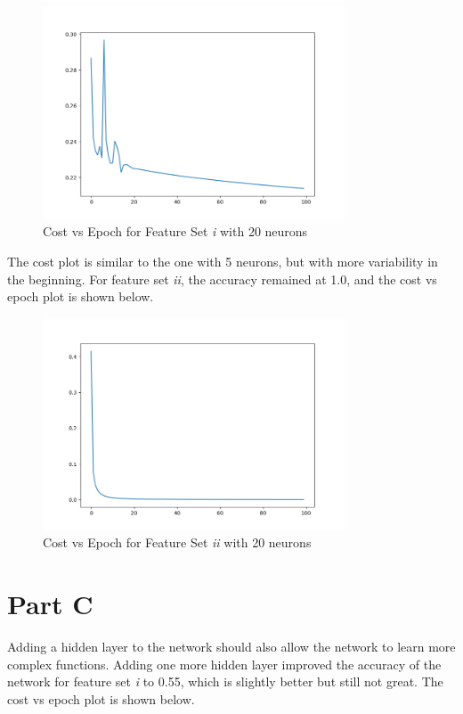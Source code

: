 \documentclass{article}
\begin{document}
\begin{figure}[H]
  \centering
  \includegraphics[width=0.8\textwidth]{Figure_4.png}
  \caption{Cost vs Epoch for Feature Set \textit{i} with 20 neurons}
\end{figure}

The cost plot is similar to the one with 5 neurons, but with more variability in the beginning. 
For feature set \textit{ii}, the accuracy remained at 1.0, and the cost vs epoch plot is shown below.

\begin{figure}[H]
  \centering
  \includegraphics[width=0.8\textwidth]{Figure_5.png}
  \caption{Cost vs Epoch for Feature Set \textit{ii} with 20 neurons}
\end{figure}

\section{Part C}

Adding a hidden layer to the network should also allow the network to learn more complex functions.
Adding one more hidden layer improved the accuracy of the network for feature set \textit{i} to 0.55, which is slightly better but still not great.
The cost vs epoch plot is shown below.
\end{document}
